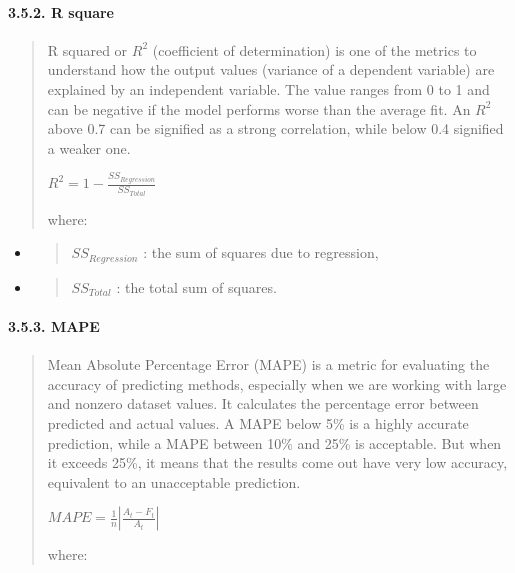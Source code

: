 \documentclass[
]{article}
\begin{document}
\hypertarget{r-square}{%
\paragraph{\texorpdfstring{\textbf{3.5.2. R
square}}{3.5.2. R square}}\label{r-square}}

\begin{quote}
R squared or \(R^{2}\) (coefficient of determination) is one of the
metrics to understand how the output values (variance of a dependent
variable) are explained by an independent variable. The value ranges
from 0 to 1 and can be negative if the model performs worse than the
average fit. An \(R^{2}\) above 0.7 can be signified as a strong
correlation, while below 0.4 signified a weaker one.

\(R^{2} = 1 - \frac{{SS}_{Regression}}{{SS}_{Total}}\)

where:
\end{quote}

\begin{itemize}
\item
  \begin{quote}
  \({SS}_{Regression}\) : the sum of squares due to regression,
  \end{quote}
\item
  \begin{quote}
  \({SS}_{Total}\) : the total sum of squares.
  \end{quote}
\end{itemize}

\hypertarget{mape}{%
\paragraph{\texorpdfstring{\textbf{3.5.3.
MAPE}}{3.5.3. MAPE}}\label{mape}}

\begin{quote}
Mean Absolute Percentage Error (MAPE) is a metric for evaluating the
accuracy of predicting methods, especially when we are working with
large and nonzero dataset values. It calculates the percentage error
between predicted and actual values. A MAPE below 5\% is a highly
accurate prediction, while a MAPE between 10\% and 25\% is acceptable.
But when it exceeds 25\%, it means that the results come out have very
low accuracy, equivalent to an unacceptable prediction.

\(MAPE = \frac{1}{n}\left| \frac{A_{t} - F_{t}}{A_{t}} \right|\)

where:
\end{quote}
\end{document}
